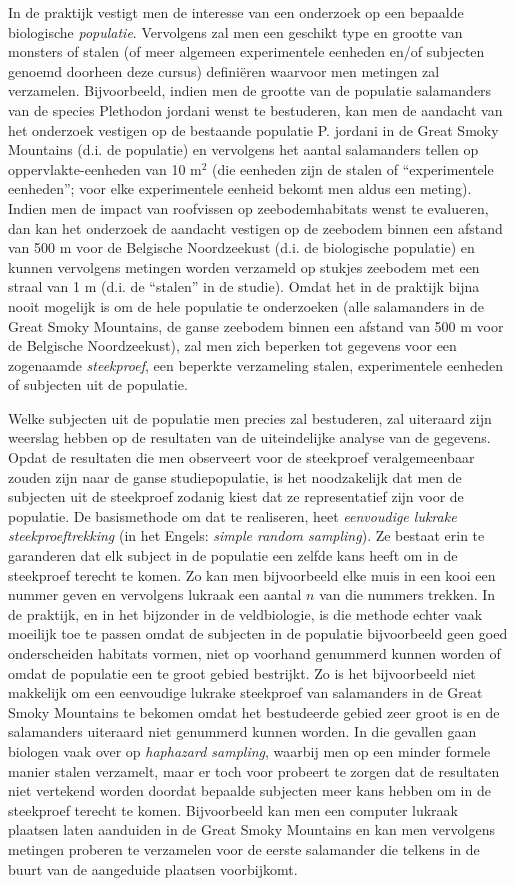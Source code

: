 \documentclass[
  12pt,dutch,coursenotes]{book}
\begin{document}
In de praktijk vestigt men de interesse van een onderzoek op een bepaalde biologische \emph{populatie}. Vervolgens zal men een geschikt type en grootte van monsters of stalen (of meer algemeen experimentele eenheden en/of subjecten genoemd doorheen deze cursus) definiëren waarvoor men metingen zal verzamelen. Bijvoorbeeld, indien men de grootte van de populatie salamanders van de species Plethodon jordani wenst te bestuderen, kan men de aandacht van het onderzoek vestigen op de bestaande populatie P. jordani in de Great Smoky Mountains (d.i. de populatie) en vervolgens het aantal salamanders tellen op oppervlakte-eenheden van 10 m\(^2\) (die eenheden zijn de stalen of ``experimentele eenheden''; voor elke experimentele eenheid bekomt men aldus een meting). Indien men de impact van roofvissen op zeebodemhabitats wenst te evalueren, dan kan het onderzoek de aandacht vestigen op de zeebodem binnen een afstand van 500 m voor de Belgische Noordzeekust (d.i. de biologische populatie) en kunnen vervolgens metingen worden verzameld op stukjes zeebodem met een straal van 1 m (d.i. de ``stalen'' in de studie). Omdat het in de praktijk bijna nooit mogelijk is om de hele populatie te onderzoeken (alle salamanders in de Great Smoky Mountains, de ganse zeebodem binnen een afstand van 500 m voor de Belgische Noordzeekust), zal men zich beperken tot gegevens voor een zogenaamde \emph{steekproef}, een beperkte verzameling stalen, experimentele eenheden of subjecten uit de populatie.

Welke subjecten uit de populatie men precies zal bestuderen, zal uiteraard zijn weerslag hebben op de resultaten van de uiteindelijke analyse van de gegevens. Opdat de resultaten die men observeert voor de steekproef veralgemeenbaar zouden zijn naar de ganse studiepopulatie, is het noodzakelijk dat men de subjecten uit de steekproef zodanig kiest dat ze representatief zijn voor de populatie. De basismethode om dat te realiseren, heet \emph{eenvoudige lukrake steekproeftrekking} (in het Engels: \emph{simple random sampling}). Ze bestaat erin te garanderen dat elk subject in de populatie een zelfde kans heeft om in de steekproef terecht te komen. Zo kan men bijvoorbeeld elke muis in een kooi een nummer geven en vervolgens lukraak een aantal \(n\) van die nummers trekken. In de praktijk, en in het bijzonder in de veldbiologie, is die methode echter vaak moeilijk toe te passen omdat de subjecten in de populatie bijvoorbeeld geen goed onderscheiden habitats vormen, niet op voorhand genummerd kunnen worden of omdat de populatie een te groot gebied bestrijkt. Zo is het bijvoorbeeld niet makkelijk om een eenvoudige lukrake steekproef van salamanders in de Great Smoky Mountains te bekomen omdat het bestudeerde gebied zeer groot is en de salamanders uiteraard niet genummerd kunnen worden. In die gevallen gaan biologen vaak over op \emph{haphazard sampling}, waarbij men op een minder formele manier stalen verzamelt, maar er toch voor probeert te zorgen dat de resultaten niet vertekend worden doordat bepaalde subjecten meer kans hebben om in de steekproef terecht te komen. Bijvoorbeeld kan men een computer lukraak plaatsen laten aanduiden in de Great Smoky Mountains en kan men vervolgens metingen proberen te verzamelen voor de eerste salamander die telkens in de buurt van de aangeduide plaatsen voorbijkomt.
\end{document}
